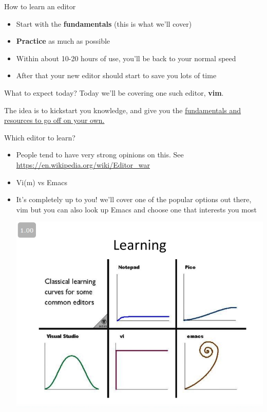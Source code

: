 \documentclass[12pt]{beamer}
\begin{document}
\begin{frame}{How to learn an editor}
    \begin{itemize}
        \item Start with the \textbf{fundamentals} (this is what we'll cover)
        \item \textbf{Practice} as much as possible
        \item Within about 10-20 hours of use, you'll be back to your normal speed
        \item After that your new editor should start to save you lots of time
    \end{itemize}{}
\end{frame}{}

\begin{frame}{What to expect today?}
        Today we'll be covering one such editor, \textbf{vim}.

        The idea is to kickstart you knowledge, and give you the \underline{fundamentals and resources to go off on your own.}
\end{frame}{}

\begin{frame}{Which editor to learn?}
    \begin{itemize}
        \item People tend to have very strong opinions on this. See \url{https://en.wikipedia.org/wiki/Editor_war}
        \item Vi(m) vs Emacs
        \item It’s completely up to you! we’ll cover one of the popular options out there, vim but you can also look up Emacs and choose one that interests you most

        \begin{center}
            \includegraphics[width=0.5\linewidth]{2022hs5/editor-curve.png} 
        \end{center}{}
    \end{itemize}{}
\end{frame}{}
\end{document}
